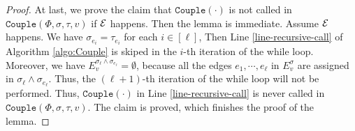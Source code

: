 \documentclass[11pt]{article}
\def\!#1{\mathtt{#1}}
\begin{document}
\begin{proof}
At last, we prove the claim that $\!{Couple}(\cdot)$ is not called in $\!{Couple}(\Phi, \sigma, \tau, v)$ if $\mathcal{E}$ happens.
Then the lemma is immediate.
Assume $\mathcal{E}$ happens.
We have $\sigma_{e_i} = \tau_{e_i}$ for each $i\in [\ell]$,
Then Line \ref{line-recursive-call} of Algorithm \ref{algo:Couple} is skiped in the $i$-th iteration of the while loop.
{Moreover, we have $E^{\sigma_{\ell}\land \sigma_{e_\ell}}_v=\emptyset$, because all the edges 
$e_1,\cdots,e_{\ell}$ in $E_v^\sigma$ are assigned in $\sigma_{\ell}\land \sigma_{e_\ell}$.}
Thus, the $(\ell+1)$-th iteration of the while loop will not be performed.
Thus, $\!{Couple}(\cdot)$ in Line \ref{line-recursive-call} is never called in $\!{Couple}(\Phi, \sigma, \tau, v)$.
The claim is proved, which finishes the proof of the lemma.


\end{proof}
\end{document}
